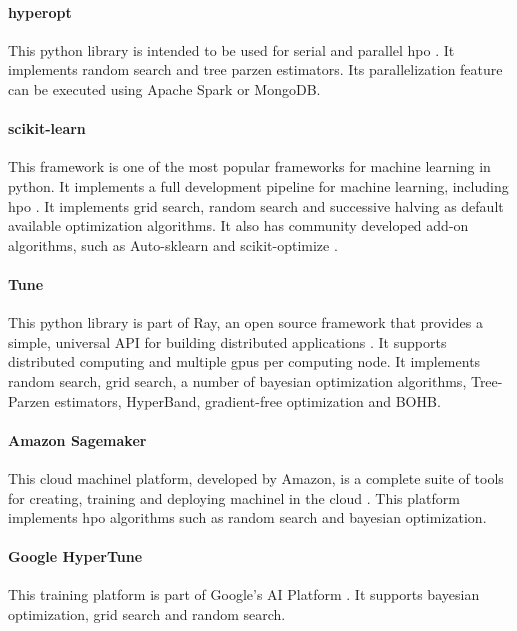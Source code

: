 \paragraph{hyperopt} This \acrshort{python} library is intended to be used for serial and parallel \acrshort{hpo} \parencite{hyperopt}. It implements random search and tree parzen estimators. Its parallelization feature can be executed using Apache Spark or MongoDB.

\paragraph{scikit-learn} This framework is one of the most popular frameworks for machine learning in \acrshort{python}. It implements a full development pipeline for machine learning, including \acrshort{hpo} \parencite{scikit-learn}. It implements grid search, random search and successive halving as default available optimization algorithms. It also has community developed add-on algorithms, such as Auto-sklearn \parencite{auto-sklearn} and scikit-optimize \parencite{scikit-optimize}.

\paragraph{Tune} This \acrshort{python} library is part of Ray, an open source framework that provides a simple, universal API for building distributed applications \parencite{ray}. It supports distributed computing and multiple \acrshort{gpu}s per computing node. It implements random search, grid search, a number of bayesian optimization algorithms, Tree-Parzen estimators, HyperBand, gradient-free optimization and BOHB.

\paragraph{Amazon Sagemaker} This cloud \acrshort{machinel} platform, developed by Amazon, is a complete suite of tools for creating, training and deploying \acrshort{machinel} in the cloud \parencite{sagemaker}. This platform implements \acrshort{hpo} algorithms such as random search and bayesian optimization.

\paragraph{Google HyperTune} This training platform is part of Google's AI Platform \parencite{ghypertune}. It supports bayesian optimization, grid search and random search.   


